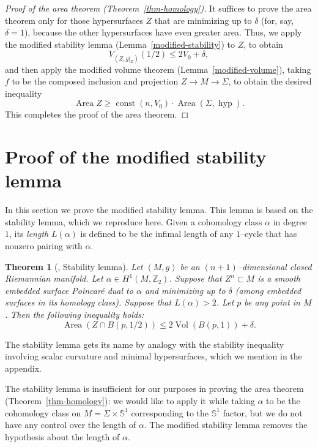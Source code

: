 \documentclass[12pt]{amsart}
\makeatletter
\newtheorem*{rep@theorem}{{Lemma} \ref##}
\newtheorem{thm}[dfn]{Theorem}
    {\newenvironment{rep{thm}}[1]{ } \begin{rep@theorem}} \end{rep@theorem}}
\numberwithin{equation}{section}
\makeatother
\begin{document}
\begin{proof}[Proof of the area theorem (Theorem~\ref{thm-homology})]
It suffices to prove the area theorem only for those hypersurfaces $Z$ that are minimizing up to $\delta$ (for, say, $\delta = 1$), because the other hypersurfaces have even greater area.  Thus, we apply the modified stability lemma (Lemma~\ref{modified-stability}) to $Z$, to obtain
\[V_{(Z, g\vert_Z)}(1/2) \leq 2V_0 + \delta,\]
and then apply the modified volume theorem (Lemma~\ref{modified-volume}), taking $f$ to be the composed inclusion and projection $Z \rightarrow M \rightarrow \Sigma$, to obtain the desired inequality
\[\operatorname{Area} Z \geq \operatorname{const}(n, V_0) \cdot \operatorname{Area} (\Sigma, \operatorname{hyp}).\]
 This completes the proof of the area theorem.
\end{proof}

\section{Proof of the modified stability lemma}\label{section-proofs}

In this section we prove the modified stability lemma.  This lemma is based on the stability lemma, which we reproduce here.  Given a cohomology class $\alpha$ in degree $1$, its \emph{length} $L(\alpha)$ is defined to be the infimal length of any $1$--cycle that has nonzero pairing with $\alpha$.

 \begin{thm}[\cite{Guth10}, Stability lemma]\label{stability-lemma}
 Let $(M, g)$ be an $(n+1)$--dimensional closed Riemannian manifold.  Let $\alpha \in H^1(M, \mathbb{Z}_2)$.  Suppose that $Z^n \subset M$ is a smooth embedded surface Poincar\'e dual to $\alpha$ and minimizing up to $\delta$ (among embedded surfaces in its homology class).  Suppose that $L(\alpha) > 2$.  Let $p$ be any point in $M$.  Then the following inequality holds:
\[\operatorname{Area}(Z \cap B(p, 1/2)) \leq 2\operatorname{Vol} (B(p, 1)) + \delta.\]
\end{thm}

The stability lemma gets its name by analogy with the stability inequality involving scalar curvature and minimal hypersurfaces, which we mention in the appendix.

The stability lemma is insufficient for our purposes in proving the area theorem (Theorem~\ref{thm-homology}): we would like to apply it while taking $\alpha$ to be the cohomology class on $M = \Sigma \times \mathbb{S}^1$ corresponding to the $\mathbb{S}^1$ factor, but we do not have any control over the length of $\alpha$.  The modified stability lemma removes the hypothesis about the length of $\alpha$.
\end{document}
